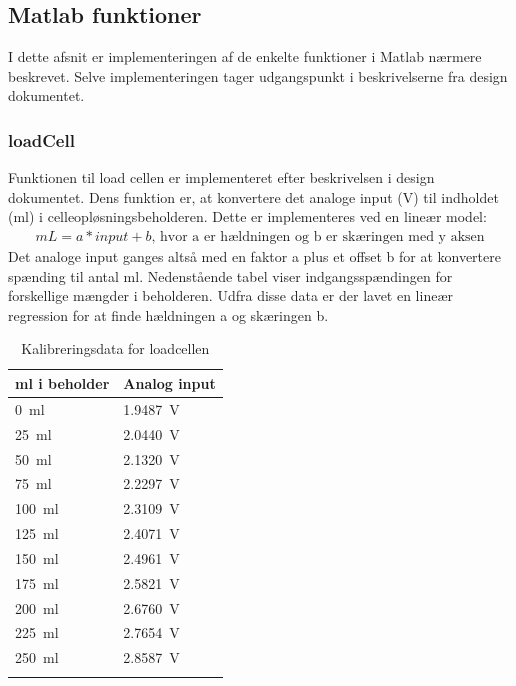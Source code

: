 \newpage
\subsection{Matlab funktioner}
I dette afsnit er implementeringen af de enkelte funktioner i Matlab nærmere beskrevet. Selve implementeringen tager udgangspunkt i beskrivelserne fra design dokumentet. %





 
\newpage
\subsubsection{loadCell}
Funktionen til load cellen er implementeret efter beskrivelsen i design dokumentet. Dens funktion er, at konvertere det analoge input (V) til indholdet (ml) i celleopløsningsbeholderen. Dette er implementeres ved en lineær model:
\begin{align}
mL = a*input+b \text{, hvor a er hældningen og b er skæringen med y aksen}
\end{align}
Det analoge input ganges altså med en faktor a plus et offset b for at konvertere spænding til antal ml. Nedenstående tabel viser indgangsspændingen for forskellige mængder i beholderen. Udfra disse data er der lavet en lineær regression for at finde hældningen a og skæringen b.
\begin{center}
		\begin{longtable}{ | m{3cm} | m{3cm}| } 
			\hline
			\textbf{ml i beholder} &\textbf{Analog input} \\ 
			\hline
			 \SI{0}{\milli\litre} & \SI{1.9487}{\volt} \\ 
			\hline
			 \SI{25}{\milli\litre} & \SI{2.0440}{\volt} \\ 
			\hline
			\SI{50}{\milli\litre} & \SI{2.1320}{\volt} \\ 
			\hline
			\SI{75}{\milli\litre} & \SI{2.2297}{\volt} \\ 
			\hline
			\SI{100}{\milli\litre} & \SI{2.3109}{\volt} \\ 
			\hline
			\SI{125}{\milli\litre} & \SI{2.4071}{\volt} \\ 
			\hline
			\SI{150}{\milli\litre} & \SI{2.4961}{\volt} \\ 
			\hline
			\SI{175}{\milli\litre} & \SI{2.5821}{\volt} \\ 
			\hline
			\SI{200}{\milli\litre} & \SI{2.6760}{\volt} \\ 
			\hline
			\SI{225}{\milli\litre} & \SI{2.7654}{\volt} \\ 
			\hline
			\SI{250}{\milli\litre} & \SI{2.8587}{\volt} \\ 
			\hline
			\caption{Kalibreringsdata for loadcellen}
			 		\end{longtable}
\end{center}

